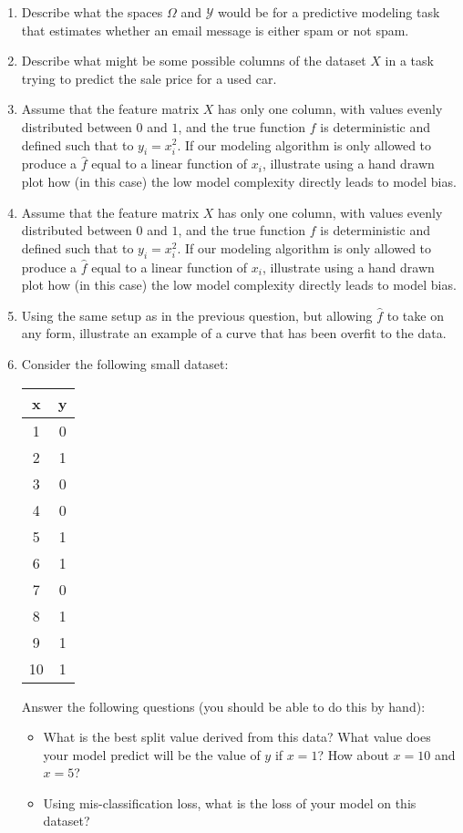 \documentclass[12pt,hidelinks]{article}
\numberwithin{equation}{section}
\begin{document}
\begin{enumerate}
\item Describe what the spaces $\Omega$ and $\mathcal{Y}$ would be for a
predictive modeling task that estimates whether an email message is either
spam or not spam.
\item Describe what might be some possible columns of the dataset $X$ in
a task trying to predict the sale price for a used car.
\item Assume that the feature matrix $X$ has only one column, with values
evenly distributed between $0$ and $1$, and the true function $f$ is
deterministic and defined such that to $y_i = x_i^2$. If our modeling
algorithm is only allowed to produce a $\widehat{f}$ equal to a linear
function of $x_i$, illustrate using a hand drawn plot how (in this case) the
low model complexity directly leads to model bias.
\item Assume that the feature matrix $X$ has only one column, with values
evenly distributed between $0$ and $1$, and the true function $f$ is
deterministic and defined such that to $y_i = x_i^2$. If our modeling
algorithm is only allowed to produce a $\widehat{f}$ equal to a linear
function of $x_i$, illustrate using a hand drawn plot how (in this case) the
low model complexity directly leads to model bias.
\item Using the same setup as in the previous question, but allowing
$\widehat{f}$ to take on any form, illustrate an example of a curve that has
been overfit to the data.
\item Consider the following small dataset:

\begin{center}
\begin{tabular}{cc}
x & y \\ \hline
1 & 0 \\
2 & 1 \\
3 & 0 \\
4 & 0 \\
5 & 1 \\
6 & 1 \\
7 & 0 \\
8 & 1 \\
9 & 1 \\
10 & 1 \\
\end{tabular}
\end{center}

Answer the following questions (you should be able to do this by hand):

\begin{itemize}
\renewcommand{\labelitemi}{\tiny $\blacksquare$}
\item What is the best split value derived from this data? What value does
your model predict will be the value of $y$ if $x = 1$? How about $x=10$ and
$x=5$?
\item Using mis-classification loss, what is the loss of your model on this
dataset?
\end{itemize}


\end{enumerate}
\end{document}

